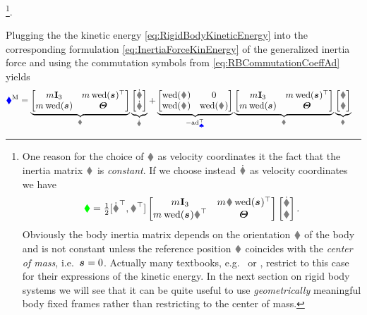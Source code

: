 \footnote{
One reason for the choice of $\v$ as velocity coordinates it the fact that the inertia matrix $\bodyInertiaMat{}{}$ is \textit{constant}.
If we choose instead $\rd$ as velocity coordinates we have
\begin{align*}
 \kineticEnergy = \tfrac{1}{2} [\rd^\top, \w^\top] \begin{bmatrix} \bodyMass{}{} \idMat[3] & \bodyMass{}{} \R \wedOp(\bodyCOM{}{})^\top \\ \bodyMass{}{} \wedOp(\bodyCOM{}{}) \R^\top & \bodyMOI{}{} \end{bmatrix} \begin{bmatrix} \rd \\ \w \end{bmatrix}.
\end{align*}
Obviously the body inertia matrix depends on the orientation $\R$ of the body and is not constant unless the reference position $\r$ coincides with the \textit{center of mass}, i.e.\ $\bodyCOM{}{}{} = 0$.
Actually many textbooks, e.g.\ \cite[p.\,167]{Murray:Robotic} or \cite[p.\,153]{Shabana:MultibodySystems}, restrict to this case for their expressions of the kinetic energy.
In the next section on rigid body systems we will see that it can be quite useful to use \textit{geometrically} meaningful body fixed frames rather than restricting to the center of mass.
}.

Plugging the the kinetic energy \eqref{eq:RigidBodyKineticEnergy} into the corresponding formulation \eqref{eq:InertiaForceKinEnergy} of the generalized inertia force and using the commutation symbols from \eqref{eq:RBCommutationCoeffAd} yields
\begin{align}\label{eq:InertiaForceRB}
 \genForceInertia &=
 \underbrace{\begin{bmatrix} \bodyMass{}{}\idMat[3] & \bodyMass{}{} \wedOp(\bodyCOM{}{})^\top \\ \bodyMass{}{} \wedOp(\bodyCOM{}{}) & \bodyMOI{}{} \end{bmatrix}}_{\bodyInertiaMat{}{}}
 \underbrace{\begin{bmatrix} \vd \\ \dot{\w} \end{bmatrix}}_{\bodyVeld{}{}}
 +
 \underbrace{\begin{bmatrix} \wedOp(\bodyAngVel{}{}) & 0 \\ \wedOp(\bodyLinVel{}{}) & \wedOp(\bodyAngVel{}{}) \end{bmatrix}}_{-\ad{\sysVel}^\top}
 \underbrace{\begin{bmatrix} \bodyMass{}{}\idMat[3] & \bodyMass{}{} \wedOp(\bodyCOM{}{})^\top \\ \bodyMass{}{} \wedOp(\bodyCOM{}{}) & \bodyMOI{}{} \end{bmatrix}}_{\bodyInertiaMat{}{}}
 \underbrace{\begin{bmatrix} \v \\ \w \end{bmatrix}}_{\bodyVel{}{}}
\end{align}

